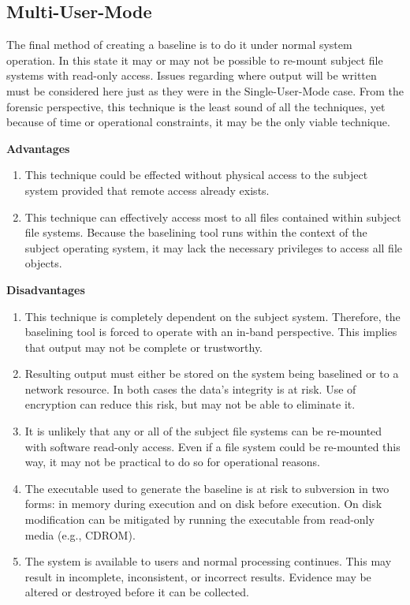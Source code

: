 \documentclass[10pt]{article}
\begin{document}
\subsection{Multi-User-Mode}

The final method of creating a baseline is to do it under normal
system operation.  In this state it may or may not be possible to
re-mount subject file systems with read-only access.  Issues regarding
where output will be written must be considered here just as they were
in the Single-User-Mode case.  From the forensic perspective, this
technique is the least sound of all the techniques, yet because of
time or operational constraints, it may be the only viable technique.

  \textbf{Advantages}

\begin{enumerate}

  \item
  This technique could be effected without physical access to the
  subject system provided that remote access already exists.

  \item
  This technique can effectively access most to all files contained
  within subject file systems.  Because the baselining tool runs
  within the context of the subject operating system, it may lack the
  necessary privileges to access all file objects.

\end{enumerate}

  \textbf{Disadvantages}

\begin{enumerate}

  \item
  This technique is completely dependent on the subject system.
  Therefore, the baselining tool is forced to operate with an in-band
  perspective.  This implies that output may not be complete or
  trustworthy.

  \item
  Resulting output must either be stored on the system being baselined
  or to a network resource.  In both cases the data's integrity is at
  risk.  Use of encryption can reduce this risk, but may not be able
  to eliminate it.

  \item
  It is unlikely that any or all of the subject file systems can be
  re-mounted with software read-only access.  Even if a file system
  could be re-mounted this way, it may not be practical to do so for
  operational reasons.

  \item
  The executable used to generate the baseline is at risk to
  subversion in two forms: in memory during execution and on disk
  before execution.  On disk modification can be mitigated by running
  the executable from read-only media (e.g., CDROM).

  \item
  The system is available to users and normal processing continues.
  This may result in incomplete, inconsistent, or incorrect results.
  Evidence may be altered or destroyed before it can be collected.

\end{enumerate}
\end{document}
